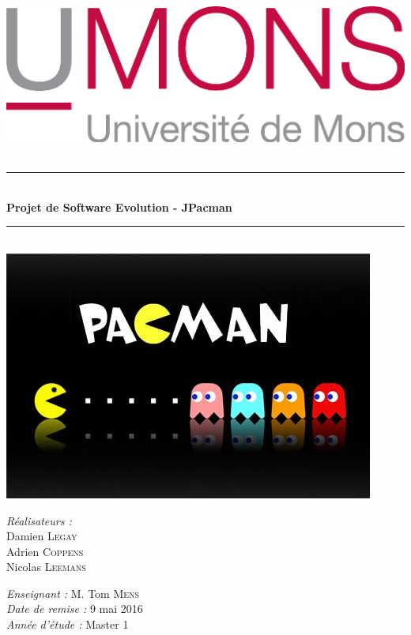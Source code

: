 \documentclass[12pt, openany]{report}
\newcommand{\HRule}{\rule{\linewidth}{0.5mm}}
\begin{document}
\begin{titlepage}
  \begin{sffamily}
  \begin{center}

    \includegraphics[scale=0.2]{Images/UMONS+txt.png}   ~\\[1.5cm]
    


    \HRule \\[0.4cm]
    { \huge \bfseries Projet de Software Evolution - JPacman\\[0.4cm] }
    \HRule \\[2cm]
    \includegraphics[scale=0.5]{Images/Pac-Man.jpg}~\\[1.5cm] 

    
    

    \begin{minipage}{0.4\textwidth}
      \begin{flushleft} \large
        \emph{Réalisateurs :\\} Damien \textsc{Legay}\\ Adrien \textsc{Coppens}\\ Nicolas \textsc{Leemans}\\
        
      \end{flushleft}
    \end{minipage}
    \begin{minipage}{0.4\textwidth}
      \begin{flushright} \large
        \emph{Enseignant :} M. Tom  \textsc{Mens}\\
        \emph{Date de remise : } 9 mai 2016\\
        \emph{Année d'étude : } Master 1
      \end{flushright}
    \end{minipage}


\end{center}
\end{sffamily}
\end{titlepage}
\end{document}
